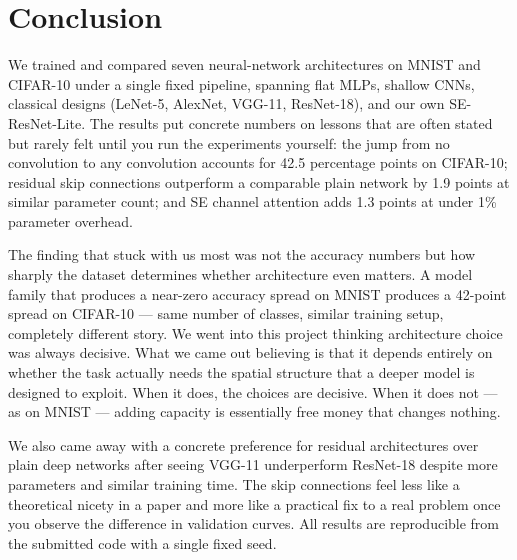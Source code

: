 \documentclass[conference,10pt]{IEEEtran}
\begin{document}
\section{Conclusion}
\label{sec:conclusion}

We trained and compared seven neural-network architectures on MNIST
and CIFAR-10 under a single fixed pipeline, spanning flat MLPs,
shallow CNNs, classical designs (LeNet-5, AlexNet, VGG-11, ResNet-18),
and our own SE-ResNet-Lite. The results put concrete numbers on
lessons that are often stated but rarely felt until you run the
experiments yourself: the jump from no convolution to any convolution
accounts for 42.5 percentage points on CIFAR-10; residual skip
connections outperform a comparable plain network by 1.9 points at
similar parameter count; and SE channel attention adds 1.3 points at
under 1\% parameter overhead.

The finding that stuck with us most was not the accuracy numbers but
how sharply the dataset determines whether architecture even matters.
A model family that produces a near-zero accuracy spread on MNIST
produces a 42-point spread on CIFAR-10 --- same number of classes,
similar training setup, completely different story. We went into this
project thinking architecture choice was always decisive. What we
came out believing is that it depends entirely on whether the task
actually needs the spatial structure that a deeper model is designed
to exploit. When it does, the choices are decisive. When it does
not --- as on MNIST --- adding capacity is essentially free money
that changes nothing.

We also came away with a concrete preference for residual architectures
over plain deep networks after seeing VGG-11 underperform ResNet-18
despite more parameters and similar training time. The skip
connections feel less like a theoretical nicety in a paper and more
like a practical fix to a real problem once you observe the difference
in validation curves. All results are reproducible from the submitted
code with a single fixed seed.



\end{document}
